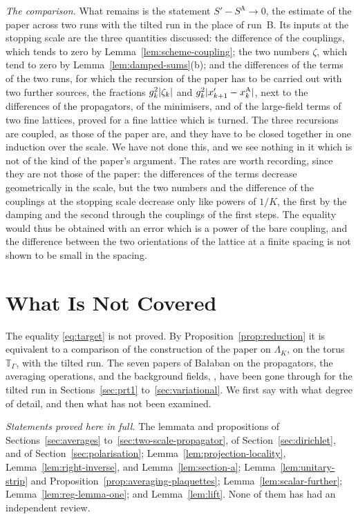 \documentclass[11pt]{preprint}
\DeclarePairedDelimiter{\abs}{\lvert}{\rvert}
\numberwithin{equation}{section}
\theoremstyle{definition}
\theoremstyle{remark}
\theoremstyle{plain}
\begin{document}
\emph{The comparison.} What remains is the statement $S' - S^{\mathrm A} \to 0$, the estimate of the paper across two runs with the tilted run in the place of run~B. Its inputs at the stopping scale are the three quantities discussed: the difference of the couplings, which tends to zero by Lemma~\ref{lem:scheme-coupling}; the two numbers $\zeta$, which tend to zero by Lemma~\ref{lem:damped-sums}(b); and the differences of the terms of the two runs, for which the recursion of the paper has to be carried out with two further sources, the fractions $g_k^2\abs{\zeta_k}$ and $g_k^2\abs{x'_{k+1} - x^{\mathrm A}_k}$, next to the differences of the propagators, of the minimisers, and of the large-field terms of two fine lattices, proved for a fine lattice which is turned. The three recursions are coupled, as those of the paper are, and they have to be closed together in one induction over the scale. We have not done this, and we see nothing in it which is not of the kind of the paper's argument. The rates are worth recording, since they are not those of the paper: the differences of the terms decrease geometrically in the scale, but the two numbers and the difference of the couplings at the stopping scale decrease only like powers of $1/K$, the first by the damping and the second through the couplings of the first steps. The equality would thus be obtained with an error which is a power of the bare coupling, and the difference between the two orientations of the lattice at a finite spacing is not shown to be small in the spacing.

\section{What Is Not Covered}\label{sec:not-covered}

The equality \eqref{eq:target} is not proved. By Proposition~\ref{prop:reduction} it is equivalent to a comparison of the construction of the paper on $\Lambda_K$, on the torus $\mathbb T_\Gamma$, with the tilted run. The seven papers of Ba{\l}aban on the propagators, the averaging operations, and the background fields, \cite{BalabanPRT1, BalabanRDG, BalabanPRT2, BalabanAVG, BalabanPBG, BalabanREG, BalabanVAR}, have been gone through for the tilted run in Sections~\ref{sec:prt1} to~\ref{sec:variational}. We first say with what degree of detail, and then what has not been examined.

\emph{Statements proved here in full.} The lemmata and propositions of Sections~\ref{sec:averages} to~\ref{sec:two-scale-propagator}, of Section~\ref{sec:dirichlet}, and of Section~\ref{sec:polarisation}; Lemma~\ref{lem:projection-locality}, Lemma~\ref{lem:right-inverse}, and Lemma~\ref{lem:section-a}; Lemma~\ref{lem:unitary-strip} and Proposition~\ref{prop:averaging-plaquettes}; Lemma~\ref{lem:scalar-further}; Lemma~\ref{lem:reg-lemma-one}; and Lemma~\ref{lem:lift}. None of them has had an independent review.
\end{document}
